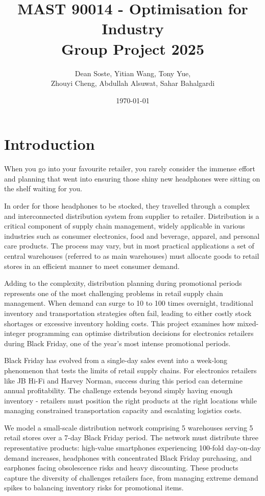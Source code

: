 \documentclass[a4paper,12pt]{article}
\title{MAST 90014 - Optimisation for Industry \\ Group Project 2025}
\author{{Dean Soste}, {Yitian Wang}, {Tony Yue}, \\
{Zhouyi Cheng}, {Abdullah Alsuwat}, {Sahar Bahalgardi}
}
\date{\today}
\begin{document}
\maketitle




\section{Introduction}\label{sec:introduction}

When you go into your favourite retailer, you rarely consider the immense effort and planning that went into ensuring those shiny new headphones were sitting on the shelf waiting for you.

In order for those headphones to be stocked, they travelled through a complex and interconnected distribution system from supplier to retailer.
Distribution is a critical component of supply chain management, widely applicable in various industries such as consumer electronics, food and beverage, apparel, and personal care products.
The process may vary, but in most practical applications a set of central warehouses (referred to as main warehouses) must allocate goods to retail stores in an efficient manner to meet consumer demand.

Adding to the complexity, distribution planning during promotional periods represents one of the most challenging problems in retail supply chain management.
When demand can surge to 10 to 100 times overnight, traditional inventory and transportation strategies often fail, leading to either costly stock shortages or excessive inventory holding costs.
This project examines how mixed-integer programming can optimise distribution decisions for electronics retailers during Black Friday, one of the year's most intense promotional periods.

Black Friday has evolved from a single-day sales event into a week-long phenomenon that tests the limits of retail supply chains.
For electronics retailers like JB Hi-Fi and Harvey Norman, success during this period can determine annual profitability.
The challenge extends beyond simply having enough inventory - retailers must position the right products at the right locations while managing constrained transportation capacity and escalating logistics costs.

We model a small-scale distribution network comprising 5 warehouses serving 5 retail stores over a 7-day Black Friday period.
The network must distribute three representative products: high-value smartphones experiencing 100-fold day-on-day demand increases, headphones with concentrated Black Friday purchasing, and earphones facing obsolescence risks and heavy discounting.
These products capture the diversity of challenges retailers face, from managing extreme demand spikes to balancing inventory risks for promotional items.
\end{document}
